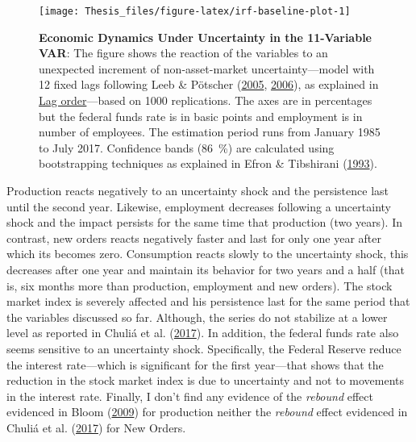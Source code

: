 \documentclass[12pt,twoside]{reedthesis}
\begin{document}
\begin{figure}

{\centering \texttt{[image: Thesis\_files/figure-latex/irf-baseline-plot-1]} 

}

\caption[Economic Dynamics Under Uncertainty in the 11-Variable VAR]{\textbf{Economic Dynamics Under Uncertainty in the 11-Variable VAR}: The figure shows the reaction of the variables to an unexpected increment of non-asset-market uncertainty---model with 12 fixed lags following Leeb \& Pötscher (\protect\hyperlink{ref-leebpots:2005}{2005}, \protect\hyperlink{ref-leebpots:2006}{2006}), as explained in \protect\hyperlink{lag-order}{Lag order}---based on 1000 replications. The axes are in percentages but the federal funds rate is in basic points and employment is in number of employees. The estimation period runs from January 1985 to July 2017. Confidence bands (86~\%) are calculated using bootstrapping techniques as explained in Efron \& Tibshirani (\protect\hyperlink{ref-efrotibs:1993}{1993}).}\label{fig:irf-baseline-plot}
\end{figure}
Production reacts negatively to an uncertainty shock and the persistence last until the second year. Likewise, employment decreases following a uncertainty shock and the impact persists for the same time that production (two years). In contrast, new orders reacts negatively faster and last for only one year after which its becomes zero. Consumption reacts slowly to the uncertainty shock, this decreases after one year and maintain its behavior for two years and a half (that is, six months more than production, employment and new orders). The stock market index is severely affected and his persistence last for the same period that the variables discussed so far. Although, the series do not stabilize at a lower level as reported in Chuliá et al. (\protect\hyperlink{ref-chuletal:2017}{2017}). In addition, the federal funds rate also seems sensitive to an uncertainty shock. Specifically, the Federal Reserve reduce the interest rate---which is significant for the first year---that shows that the reduction in the stock market index is due to uncertainty and not to movements in the interest rate. Finally, I don't find any evidence of the \emph{rebound} effect evidenced in Bloom (\protect\hyperlink{ref-bloom:2009}{2009}) for production neither the \emph{rebound} effect evidenced in Chuliá et al. (\protect\hyperlink{ref-chuletal:2017}{2017}) for New Orders.
\end{document}
